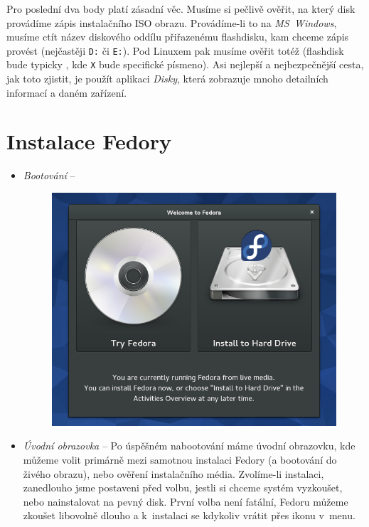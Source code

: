 Pro poslední dva body platí zásadní věc. Musíme si pečlivě ověřit, na který disk provádíme zápis instalačního ISO obrazu. Provádíme-li to na \emph{MS~Windows}, musíme ctít název diskového oddílu přiřazenému flashdisku, kam chceme zápis provést (nejčastěji \texttt{D:} či \texttt{E:}). Pod Linuxem pak musíme ověřit totéž (flashdisk bude typicky , kde \texttt{X} bude specifické písmeno). Asi nejlepší a nejbezpečnější cesta, jak toto zjistit, je použít aplikaci \emph{Disky}, která zobrazuje mnoho detailních informací a daném zařízení.

\section*{Instalace Fedory}
\begin{itemize}
\item\emph{Bootování} -- 

\begin{figure}[t]
\begin{center}
\includegraphics[width=.75\textwidth]{img/instalator-a}
 \label{fig:instalator-a}
\end{center}
\end{figure}

\item\emph{Úvodní obrazovka} -- Po úspěšném nabootování máme úvodní obrazovku, kde můžeme volit primárně mezi samotnou instalaci Fedory (a bootování do živého obrazu), nebo ověření instalačního média. Zvolíme-li instalaci, zanedlouho jsme postaveni před volbu, jestli si chceme systém vyzkoušet, nebo nainstalovat na pevný disk. První volba není fatální, Fedoru můžeme zkoušet libovolně dlouho a k~instalaci se kdykoliv vrátit přes ikonu v~menu.


\end{itemize}
